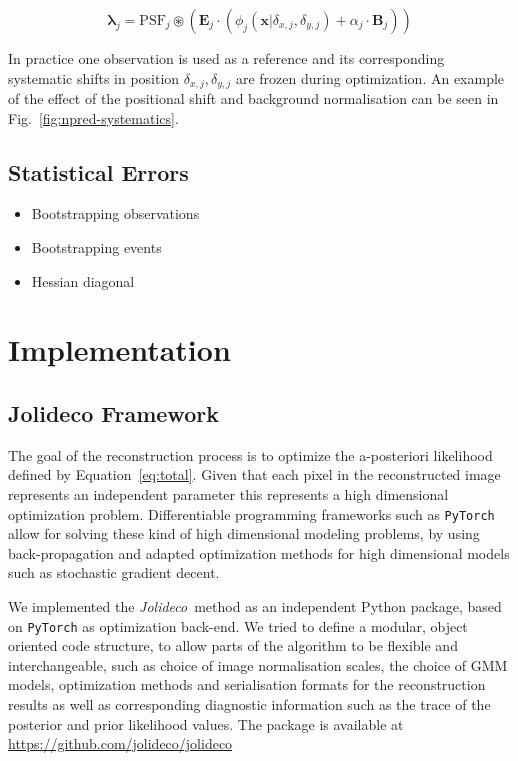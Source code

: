 \documentclass[twocolumn]{aastex631}
\newcommand{\jolideco}{\textit{Jolideco}~}
\begin{document}
    \begin{equation}
        \label{eq:model-npred-calibration}
        \mathbf{\lambda}_j = \mathrm{PSF}_j \circledast \left(\mathbf{E}_j \cdot (\phi_j(\mathbf{x}| \delta_{x,j}, \delta_{y,j}) + \alpha_j \cdot \mathbf{B}_j) \right)
    \end{equation}
    
    In practice one observation is used as a reference and its corresponding
    systematic shifts in position $\delta_{x,j}, \delta_{y,j}$ are frozen during
    optimization. An example of the effect of the positional shift and background
    normalisation can be seen in Fig.~\ref{fig:npred-systematics}.

    \subsection{Statistical Errors}
    \begin{itemize}
        \item Bootstrapping observations
        \item Bootstrapping events
        \item Hessian diagonal
    \end{itemize}


    \section{Implementation}
    \subsection{Jolideco Framework}
    The goal of the reconstruction process is to optimize the a-posteriori likelihood defined by Equation~\ref{eq:total}. Given that each pixel in the reconstructed image represents an independent parameter this represents a high dimensional optimization problem. Differentiable programming frameworks such as \texttt{PyTorch}~\citep{Pytorch2019} allow for solving these kind of high dimensional modeling problems, by using back-propagation and adapted optimization methods for high dimensional models such as stochastic gradient decent.

    We implemented the \jolideco method as an independent Python package, based on \texttt{PyTorch} as optimization back-end. We tried to define a modular, object oriented code structure, to allow parts of the algorithm to be flexible and interchangeable, such as choice of image normalisation scales, the choice of GMM models, optimization methods and serialisation formats for the reconstruction results as well as corresponding diagnostic information such as the trace of the posterior and prior likelihood values. The package is available at \url{https://github.com/jolideco/jolideco}
\end{document}
